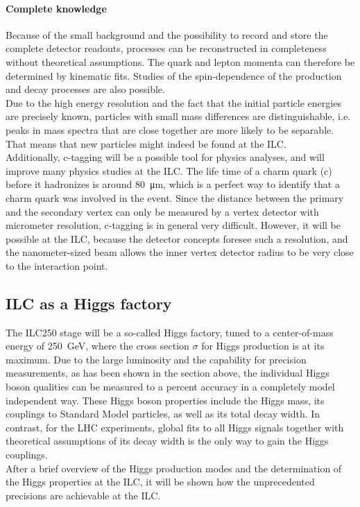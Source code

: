 \paragraph{Complete knowledge}
Because of the small background and the possibility to record and store the complete detector readouts, processes can be reconstructed in completeness without theoretical assumptions.
The quark and lepton momenta can therefore be determined by kinematic fits.
Studies of the spin-dependence of the production and decay processes are also possible.\\
Due to the high energy resolution and the fact that the initial particle energies are precisely known, particles with small mass differences are distinguishable, i.e. peaks in mass spectra that are close together are more likely to be separable.
That means that new particles might indeed be found at the ILC.\\
Additionally, c-tagging will be a possible tool for physics analyses, and will improve many physics studies at the ILC.
The life time of a charm quark (c) before it hadronizes is around \SI{80}{\micro\meter}, which is a perfect way to identify that a charm quark was involved in the event.
Since the distance between the primary and the secondary vertex can only be measured by a vertex detector with micrometer resolution, c-tagging is in general very difficult.
However, it will be possible at the ILC, because the detector concepts foresee such a resolution, and the nanometer-sized beam allows the inner vertex detector radius to be very close to the interaction point.

\subsection{ILC as a Higgs factory}
The ILC250 stage will be a so-called Higgs factory, tuned to a center-of-mass energy of \SI{250}{\GeV}, where the cross section $\sigma$ for Higgs production is at its maximum.
Due to the large luminosity and the capability for precision measurements, as has been shown in the section above, the individual Higgs boson qualities can be measured to a percent accuracy in a completely model independent way.
These Higgs boson properties include the Higgs mass, its couplings to Standard Model particles, as well as its total decay width.
In contrast, for the LHC experiments, global fits to all Higgs signals together with theoretical assumptions of its decay width is the only way to gain the Higgs couplings.
\\After a brief overview of the Higgs production modes and the determination of the Higgs properties at the ILC, it will be shown how the unprecedented precisions are achievable at the ILC.

